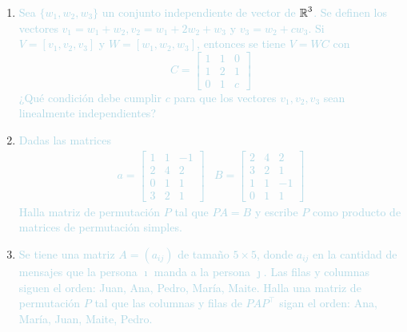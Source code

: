 \begin{center}
	\large\textbf{}
\end{center}
\renewcommand{\arraystretch}{1}
\begin{enumerate}[label=\color{red}\textbf{\arabic*)},leftmargin=*]
	\item \textcolor{lightblue}{Sea $\{w_1,w_2,w_3\}$ un conjunto independiente de vector de $\operatorname{\mathbb{R}}^3$. Se definen los vectores $v_1=w_1+w_2,v_2=w_1+2w_2+w_3$ y $v_3=w_2+cw_3$. Si $V=[v_1,v_2,v_3]$ y $W=[w_1,w_2,w_3]$, entonces  se tiene $V=WC$ con \[ C=\begin{bmatrix}
			1 & 1 & 0\\
			1 & 2 & 1\\
			0 & 1 & c
		\end{bmatrix} \] ¿Qué condición debe cumplir $c$ para que los vectores $v_1,v_2,v_3$ sean linealmente independientes?}
	
	
	\item \textcolor{lightblue}{Dadas las matrices \[ \begin{array}{ll}
			a=\begin{bmatrix}
				1 & 1 & -1 \\
				2 & 4 & 2 \\
				0 & 1 & 1 \\
				3 & 2 & 1
			\end{bmatrix}
		& B=\begin{bmatrix}
		2 & 4 & 2 \\
		3 & 2 & 1 \\
		1 & 1 & -1 \\
		0 & 1 & 1
		\end{bmatrix}\end{array} \] Halla matriz de permutación $P$ tal que $PA=B$ y escribe $P$ como producto de matrices de permutación simples.}
	
	
	\item \textcolor{lightblue}{Se tiene una matriz $A=(a_{ij})$ de tamaño $5\times5$, donde $a_{ij}$ en la cantidad de mensajes que la persona $\imath$ manda a la persona $\jmath$. Las filas y columnas siguen el orden: Juan, Ana, Pedro, María, Maite. Halla una matriz de permutación $P$ tal que las columnas y filas de $PAP^\intercal $ sigan el orden: Ana, María, Juan, Maite, Pedro.}
	

\end{enumerate}
